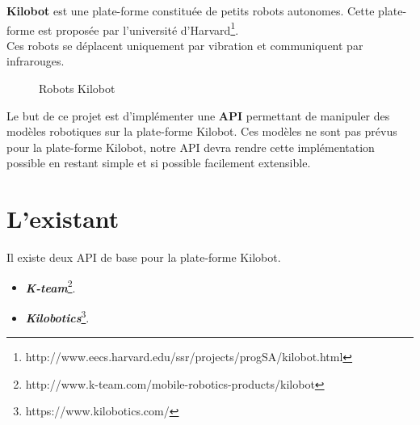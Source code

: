 \documentclass[a4paper,8pt]{report}
\begin{document}
\textbf{Kilobot} est une plate-forme constitu\'ee de petits robots autonomes. Cette plate-forme est propos\'ee par l'universit\'e d'Harvard\footnote{http://www.eecs.harvard.edu/ssr/projects/progSA/kilobot.html}. \\
Ces robots se d\'eplacent uniquement par vibration et communiquent par infrarouges.\\

\begin{figure}[!h]
    \centering
    \caption{Robots Kilobot}
\end{figure}

\smallskip
Le but de ce projet est d'impl\'ementer une \textbf{API} permettant de manipuler des mod\`eles robotiques sur la plate-forme Kilobot. Ces mod\`eles ne sont pas pr\'evus pour la plate-forme Kilobot, notre API devra rendre cette impl\'ementation possible en restant simple et si possible facilement extensible.\\

\bigskip

\section*{L'existant}\label{sec:name}

Il existe deux API de base pour la plate-forme Kilobot.\\

\begin{itemize}
\item \textit{\textbf{K-team}}\footnote{http://www.k-team.com/mobile-robotics-products/kilobot}.
\item \textit{\textbf{Kilobotics}}\footnote{https://www.kilobotics.com/}.
\end{itemize}
\end{document}
